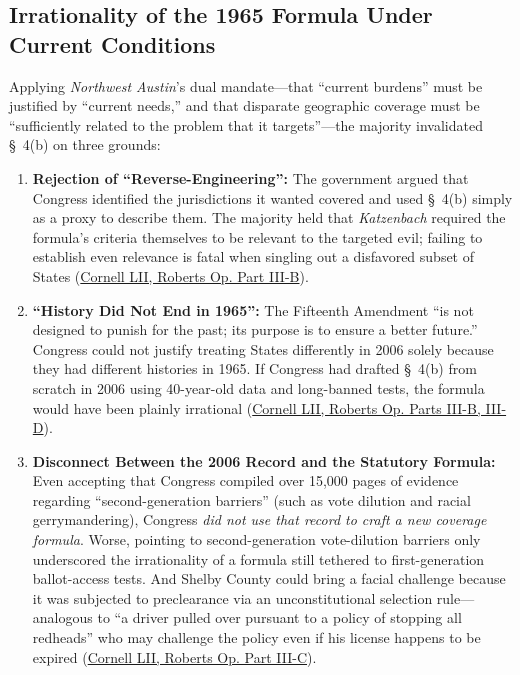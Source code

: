 \documentclass[12pt]{article}
\begin{document}
\subsection{Irrationality of the 1965 Formula Under Current Conditions}
Applying \emph{Northwest Austin}'s dual mandate---that ``current burdens'' must be justified by ``current needs,'' and that disparate geographic coverage must be ``sufficiently related to the problem that it targets''---the majority invalidated \S~4(b) on three grounds:
\begin{enumerate}
    \item \textbf{Rejection of ``Reverse-Engineering'':} The government argued that Congress identified the jurisdictions it wanted covered and used \S~4(b) simply as a proxy to describe them. The majority held that \emph{Katzenbach} required the formula's criteria themselves to be relevant to the targeted evil; failing to establish even relevance is fatal when singling out a disfavored subset of States (\href{https://www.law.cornell.edu/supremecourt/text/12-96}{Cornell LII, Roberts Op. Part III-B}).
    \item \textbf{``History Did Not End in 1965'':} The Fifteenth Amendment ``is not designed to punish for the past; its purpose is to ensure a better future.'' Congress could not justify treating States differently in 2006 solely because they had different histories in 1965. If Congress had drafted \S~4(b) from scratch in 2006 using 40-year-old data and long-banned tests, the formula would have been plainly irrational (\href{https://www.law.cornell.edu/supremecourt/text/12-96}{Cornell LII, Roberts Op. Parts III-B, III-D}).
    \item \textbf{Disconnect Between the 2006 Record and the Statutory Formula:} Even accepting that Congress compiled over 15,000 pages of evidence regarding ``second-generation barriers'' (such as vote dilution and racial gerrymandering), Congress \emph{did not use that record to craft a new coverage formula}. Worse, pointing to second-generation vote-dilution barriers only underscored the irrationality of a formula still tethered to first-generation ballot-access tests. And Shelby County could bring a facial challenge because it was subjected to preclearance via an unconstitutional selection rule---analogous to ``a driver pulled over pursuant to a policy of stopping all redheads'' who may challenge the policy even if his license happens to be expired (\href{https://www.law.cornell.edu/supremecourt/text/12-96}{Cornell LII, Roberts Op. Part III-C}).
\end{enumerate}
\end{document}
